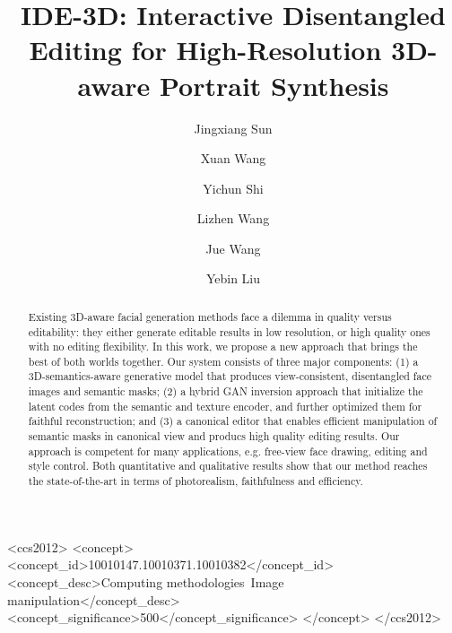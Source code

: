 \documentclass[acmtog]{acmart}
\begin{document}
\title{IDE-3D: Interactive Disentangled Editing for High-Resolution 3D-aware Portrait Synthesis}


\author{Jingxiang Sun}

\author{Xuan Wang}


\author{Yichun Shi}

\author{Lizhen Wang}

\author{Jue Wang}

\author{Yebin Liu}






\renewcommand{\shortauthors}{Sun et al.}

\begin{abstract}
Existing 3D-aware facial generation methods face a dilemma in quality versus editability: they either generate editable results in low resolution, or high quality ones with no editing flexibility. In this work, we propose a new approach that brings the best of both worlds together. Our system consists of three major components: (1) a 3D-semantics-aware generative model 
that produces view-consistent, disentangled face images and semantic masks; (2) a hybrid GAN inversion approach that initialize the latent codes from the semantic and texture encoder, and further optimized them for faithful reconstruction; and (3) a canonical editor that enables efficient manipulation of semantic masks in canonical view and producs high quality editing results. Our approach is competent for many applications, e.g. free-view face drawing, editing and style control. Both quantitative and qualitative results show that our method reaches the state-of-the-art in terms of photorealism, faithfulness and efficiency.
\end{abstract}





\begin{CCSXML}
<ccs2012>
<concept>
<concept_id>10010147.10010371.10010382</concept_id>
<concept_desc>Computing methodologies~Image manipulation</concept_desc>
<concept_significance>500</concept_significance>
</concept>
</ccs2012>
\end{CCSXML}
\end{document}
